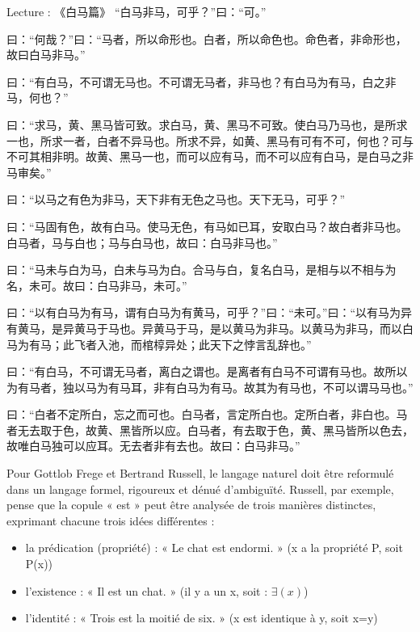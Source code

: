 \begin{lecture}{Lecture : 《白马篇》}
\normalfont
“白马非马，可乎？”曰：“可。”

曰：“何哉？”曰：“马者，所以命形也。白者，所以命色也。命色者，非命形也，故曰白马非马。”

曰：“有白马，不可谓无马也。不可谓无马者，非马也？有白马为有马，白之非马，何也？”

曰：“求马，黄、黑马皆可致。求白马，黄、黑马不可致。使白马乃马也，是所求一也，所求一者，白者不异马也。所求不异，如黄、黑马有可有不可，何也？可与不可其相非明。故黄、黑马一也，而可以应有马，而不可以应有白马，是白马之非马审矣。”

曰：“以马之有色为非马，天下非有无色之马也。天下无马，可乎？”

曰：“马固有色，故有白马。使马无色，有马如已耳，安取白马？故白者非马也。白马者，马与白也；马与白马也，故曰：白马非马也。”

曰：“马未与白为马，白未与马为白。合马与白，复名白马，是相与以不相与为名，未可。故曰：白马非马，未可。”

曰：“以有白马为有马，谓有白马为有黄马，可乎？”曰：“未可。”曰：“以有马为异有黄马，是异黄马于马也。异黄马于马，是以黄马为非马。以黄马为非马，而以白马为有马；此飞者入池，而棺椁异处；此天下之悖言乱辞也。”

曰：“有白马，不可谓无马者，离白之谓也。是离者有白马不可谓有马也。故所以为有马者，独以马为有马耳，非有白马为有马。故其为有马也，不可以谓马马也。”

曰：“白者不定所白，忘之而可也。白马者，言定所白也。定所白者，非白也。马者无去取于色，故黄、黑皆所以应。白马者，有去取于色，黄、黑马皆所以色去，故唯白马独可以应耳。无去者非有去也。故曰：白马非马。”
\end{lecture}

Pour Gottlob Frege et Bertrand Russell, le langage naturel doit être reformulé dans un langage formel, rigoureux et dénué d’ambiguïté. Russell, par exemple, pense que la copule « est » peut être analysée de trois manières distinctes, exprimant chacune trois idées différentes :
\begin{itemize}
\item la prédication (propriété) : « Le chat est endormi. » (x a la propriété P, soit P(x))
\item l’existence : « Il est un chat. » (il y a un x, soit : $\exists(x)$)
\item l’identité : « Trois est la moitié de six. » (x est identique à y, soit x=y)
\end{itemize}

